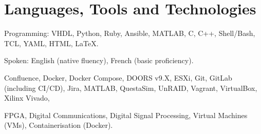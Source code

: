 %
%
\section{Languages, Tools and Technologies}
{}
\descript{ }
Programming: \hspace{0.5em} VHDL, Python, Ruby, Ansible, MATLAB, C, C++, Shell/Bash, TCL, YAML, HTML, \LaTeX.

Spoken: \hspace{3em} English (native fluency), French (basic proficiency).

\sectionsep

\descript{ }
Confluence, Docker, Docker Compose, DOORS v9.X, ESXi, Git, GitLab (including CI/CD), Jira, MATLAB, QuestaSim, UnRAID, Vagrant, VirtualBox, Xilinx Vivado,

\sectionsep

\descript{ }
FPGA, Digital Communications, Digital Signal Processing, Virtual Machines (VMs), Containerisation (Docker).

\sectionsep